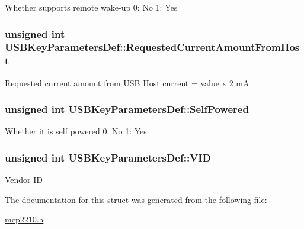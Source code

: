\-Whether supports remote wake-\/up 0\-: \-No 1\-: \-Yes \hypertarget{struct_u_s_b_key_parameters_def_a37e6e0ff7720d067ea185fd9b19d0ba8}{
\subsubsection[{\-Requested\-Current\-Amount\-From\-Host}]{\setlength{\rightskip}{0pt plus 5cm}unsigned int {\bf \-U\-S\-B\-Key\-Parameters\-Def\-::\-Requested\-Current\-Amount\-From\-Host}}}\label{struct_u_s_b_key_parameters_def_a37e6e0ff7720d067ea185fd9b19d0ba8}
\-Requested current amount from \-U\-S\-B \-Host current = value x 2 m\-A \hypertarget{struct_u_s_b_key_parameters_def_aace169dc444713da0e0c0f5672d64bd0}{
\subsubsection[{\-Self\-Powered}]{\setlength{\rightskip}{0pt plus 5cm}unsigned int {\bf \-U\-S\-B\-Key\-Parameters\-Def\-::\-Self\-Powered}}}\label{struct_u_s_b_key_parameters_def_aace169dc444713da0e0c0f5672d64bd0}
\-Whether it is self powered 0\-: \-No 1\-: \-Yes \hypertarget{struct_u_s_b_key_parameters_def_a35d04341dee0696d60990dfe9b066835}{
\subsubsection[{\-V\-I\-D}]{\setlength{\rightskip}{0pt plus 5cm}unsigned int {\bf \-U\-S\-B\-Key\-Parameters\-Def\-::\-V\-I\-D}}}\label{struct_u_s_b_key_parameters_def_a35d04341dee0696d60990dfe9b066835}
\-Vendor \-I\-D 

\-The documentation for this struct was generated from the following file\-:\begin{DoxyCompactItemize}
\item 
\hyperlink{mcp2210_8h}{mcp2210.\-h}\end{DoxyCompactItemize}
